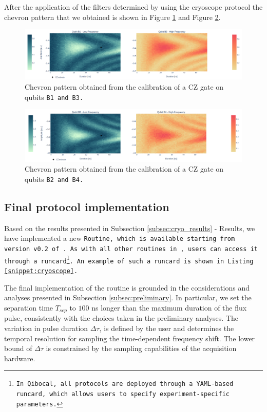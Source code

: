 After the application of the filters determined by using the cryoscope protocol the chevron pattern that we obtained is shown in Figure \ref{fig:B1B3} and Figure \ref{fig:B2B4}.

\begin{figure}[h!]
    \centering
    \includegraphics[width=\textwidth]{figures/png/Cryoscope/B1B3.png}
    \caption{Chevron pattern obtained from the calibration of a CZ gate on qubits \tt{B1} and \tt{B3}.}
    \label{fig:B1B3}
\end{figure}

\begin{figure}[h!]
    \centering
    \includegraphics[width=\textwidth]{figures/png/Cryoscope/B2B4.png}
    \caption{Chevron pattern obtained from the calibration of a CZ gate on qubits \tt{B2} and \tt{B4}.}
    \label{fig:B2B4}
\end{figure}

\newpage
\restoregeometry

\subsection{Final protocol implementation}

Based on the results presented in Subsection \ref{subsec:cryo_results} - Results, we have implemented a new \tt{Routine}, which is available starting from version v0.2 of \Qibocal. 
As with all other routines in \Qibocal, users can access it through a runcard\footnote{In Qibocal, all protocols are deployed through a YAML-based runcard, which allows users to specify experiment-specific parameters.}. 
An example of such a runcard is shown in Listing \ref{snippet:cryoscope}.

The final implementation of the routine is grounded in the considerations and analyses presented in Subsection \ref{subsec:preliminary}. 
In particular, we set the separation time $T_{sep}$ to $100$ ns longer than the maximum duration of the flux pulse, consistently with the choices taken in the preliminary analyses. 
The variation in pulse duration $\Delta\tau$, is defined by the user and determines the temporal resolution for sampling the time-dependent frequency shift. 
The lower bound of $\Delta\tau$ is constrained by the sampling capabilities of the acquisition hardware.

